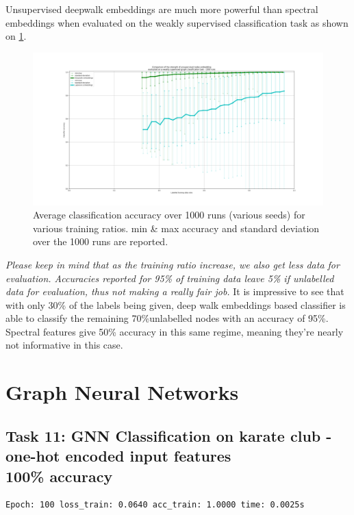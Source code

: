 \documentclass[a4paper]{article}
\begin{document}
Unsupervised deepwalk embeddings are much more powerful than spectral embeddings when evaluated on
the weakly supervised classification task as shown on \ref{fig:deepwalk_vs_laplacian_embdeddings}.
\begin{figure}[ht]
    \centering
    \includegraphics[width=1.\textwidth]{figures/deepwalk_vs_laplacian_embeddings_1000runs.png}
    \caption{Average classification accuracy over 1000 runs (various seeds) for various training ratios. 
    min \& max accuracy and standard deviation over the 1000 runs are reported.}
    \label{fig:deepwalk_vs_laplacian_embdeddings}
\end{figure}
\textit{Please keep in mind that as the training ratio increase, we also get less data for evaluation.
Accuracies reported for 95\% of training data leave 5\% if unlabelled data for evaluation,
thus not making a really fair job.} It is impressive to see that with only 30\% of the labels being given, deep walk
embeddings based classifier is able to classify the remaining 70\%unlabelled nodes with an accuracy of 95\%.
Spectral features give 50\% accuracy in this same regime, meaning they're nearly not informative in this case.



\break

\section{Graph Neural Networks}
\subsection*{Task 11: GNN Classification on karate club - one-hot encoded input features \\ 100\% accuracy}
\begin{verbatim}
Epoch: 100 loss_train: 0.0640 acc_train: 1.0000 time: 0.0025s
\end{verbatim}
\end{document}
